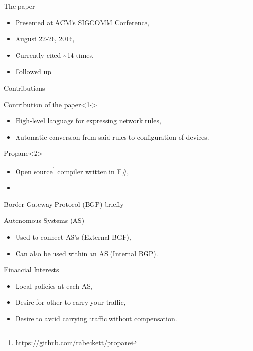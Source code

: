 \begin{frame}{The paper}
    \begin{block}{}
        \begin{itemize}
            \item Presented at ACM's SIGCOMM Conference,
            \item August 22-26, 2016,
            \item Currently cited \~{}14 times.
            \item Followed up 
        \end{itemize}
    \end{block}
\end{frame}

\begin{frame}{Contributions}
    \begin{block}{Contribution of the paper}<1->
        \begin{itemize}
            \item High-level language for expressing \textcolor{ReneOrange}{network rules},
            \item \textcolor{ReneOrange}{Automatic conversion} from said rules to configuration of devices.
        \end{itemize}
    \end{block}
    \begin{block}{Propane}<2>
        \begin{itemize}
            \item Open source\footnote{\url{https://github.com/rabeckett/propane}} compiler written in F\#,
            \item 
        \end{itemize}
    \end{block}
\end{frame}

\begin{frame}{Border Gateway Protocol (BGP) briefly}
    \begin{block}{Autonomous Systems (AS)}
        \begin{itemize}
            \item Used to connect AS's (External BGP),
            \item Can also be used within an AS (Internal BGP).
        \end{itemize}
    \end{block}
    \begin{block}{Financial Interests}
        \begin{itemize}
            \item Local policies at each AS,
            \item Desire for other to carry your traffic,
            \item Desire to avoid carrying traffic without compensation.
        \end{itemize}
    \end{block}
\end{frame}

